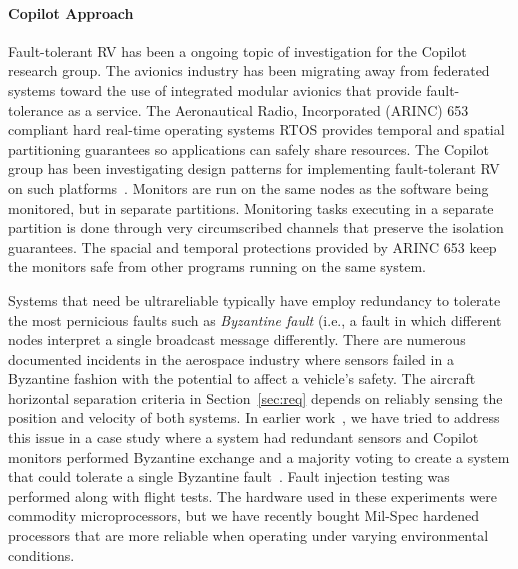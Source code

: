 \paragraph{Copilot Approach} Fault-tolerant RV has been a ongoing
topic of investigation for the Copilot research group. The avionics
industry has been migrating away from federated systems toward the use
of integrated modular avionics that provide fault-tolerance as a
service.  The Aeronautical Radio, Incorporated (ARINC)
653~\cite{ARINC653} compliant hard real-time operating systems RTOS
provides temporal and spatial partitioning guarantees so applications
can safely share resources.  The Copilot group has been investigating
design patterns for implementing fault-tolerant RV on such
platforms~\cite{Kaveh15}. Monitors are run on the same nodes as the
software being monitored, but in separate partitions. Monitoring tasks
executing in a separate partition is done through very circumscribed
channels that preserve the isolation guarantees.  The spacial and
temporal protections provided by ARINC 653 keep the monitors safe from
other programs running on the same system.

Systems that need be ultrareliable typically have employ redundancy to
tolerate the most pernicious faults such as \emph{Byzantine fault}
(i.e., a fault in which different nodes interpret a single broadcast
message differently.  There are numerous documented incidents in the
aerospace industry where sensors failed in a Byzantine fashion with
the potential to affect a vehicle's safety.  The aircraft horizontal separation criteria in
Section~\ref{sec:req} depends on reliably sensing the position and
velocity of both systems. In earlier work~\cite{pike-isse-13}, we have
tried to address this issue in a case study where a system had
redundant sensors and Copilot monitors performed Byzantine exchange and a
majority voting to create a system that could tolerate a single
Byzantine fault~\cite{pike-isse-13}.  Fault injection testing was
performed along with flight tests.  The hardware used in these
experiments were commodity microprocessors, but we have recently
bought Mil-Spec hardened processors that are more reliable when operating
under varying environmental conditions.




